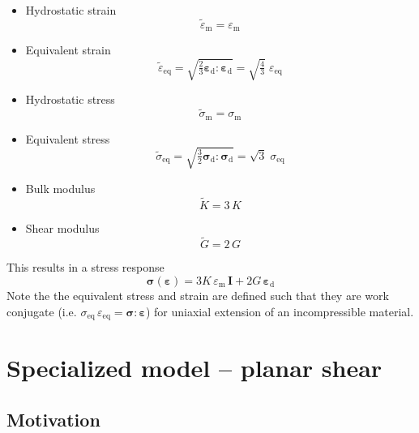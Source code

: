 \documentclass[times,namecite]{goose-article}
\begin{document}
\begin{itemize}
  \item Hydrostatic strain
  \begin{equation}
    \tilde{\varepsilon}_\mathrm{m} = \varepsilon_\mathrm{m}
  \end{equation}
  \item Equivalent strain
  \begin{equation}
    \tilde{\varepsilon}_\mathrm{eq}
    = \sqrt{\tfrac{2}{3} \bm{\varepsilon}_\mathrm{d} : \bm{\varepsilon}_\mathrm{d} }
    = \sqrt{\tfrac{4}{3}} \; \varepsilon_\mathrm{eq}
  \end{equation}
  \item Hydrostatic stress
  \begin{equation}
    \tilde{\sigma}_\mathrm{m} = \sigma_\mathrm{m}
  \end{equation}
  \item Equivalent stress
  \begin{equation}
    \tilde{\sigma}_\mathrm{eq}
    = \sqrt{\tfrac{3}{2} \bm{\sigma}_\mathrm{d} : \bm{\sigma}_\mathrm{d} }
    = \sqrt{3} \; \sigma_\mathrm{eq}
  \end{equation}
  \item Bulk modulus
  \begin{equation}
    \tilde{K} = 3 \, K
  \end{equation}
  \item Shear modulus
  \begin{equation}
    \tilde{G} = 2 \, G
  \end{equation}
\end{itemize}
This results in a stress response
\begin{equation}
  \bm{\sigma} ( \bm{\varepsilon} )
  =
  3 K \, \varepsilon_\mathrm{m} \, \bm{I}
  +
  2 G \, \bm{\varepsilon}_\mathrm{d}
\end{equation}
Note the the equivalent stress and strain are defined such that they are work conjugate (i.e. $\sigma_\mathrm{eq} \, \varepsilon_\mathrm{eq} = \bm{\sigma} : \bm{\varepsilon}$) for uniaxial extension of an incompressible material.

\section{Specialized model -- planar shear}

\subsection{Motivation}
\end{document}
